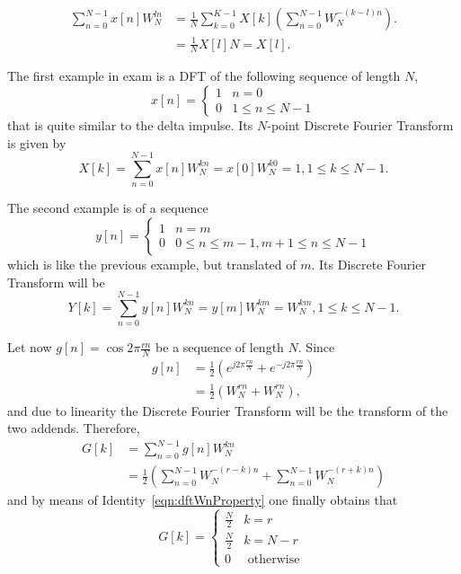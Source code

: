 \documentclass[\documentfontsize, twocolumn]{\classname}
\begin{document}
\begin{align*}
    \sum_{n=0}^{N-1} x[n] W_N^{ln}
    &= \frac 1 N \sum_{k=0}^{K-1} X[k] \left(\sum_{n=0}^{N-1}W_N^{-(k-l)n}\right).\\
    &= \frac 1 N X[l] N = X[l].
\end{align*}

The first example in exam is a DFT of the following sequence of length $N$,
\[
    x[n] = \left\{\begin{array}{ll} 
            1 & n=0\\
            0 & 1 \leq n \leq N-1
        \end{array}\right.
\]
that is quite similar to the delta impulse. Its $N$-point Discrete Fourier Transform is given by
\[
    X[k] = \sum_{n=0}^{N-1} x[n]W_N^{kn} = x[0]W_N^{k0} = 1, 1\leq k \leq N-1.
\]

The second example is of a sequence
\[
    y[n] = \left\{\begin{array}{ll} 
            1 & n=m\\
            0 & 0\leq n \leq m-1, m+1 \leq n \leq N-1
        \end{array}\right.
\]
which is like the previous example, but translated of $m$. Its Discrete Fourier Transform will be
\[
    Y[k] = \sum_{n=0}^{N-1} y[n]W_N^{kn} = y[m]W_N^{km} = W_N^{km}, 1\leq k \leq N-1.
\]

Let now $g[n] = \cos{2\pi \frac{rn}{N}}$ be a sequence of length $N$. Since
\begin{align*}
    g[n] &= \frac 1 2 \left(e^{j2\pi \frac{rn}{N}} + e^{-j2\pi \frac{rn}{N}}\right)\\
         &= \frac 1 2 \left(W_N^{rn} + W_N^{rn}\right),
\end{align*}
and due to linearity the Discrete Fourier Transform will be the transform of the two addends. Therefore,
\begin{align*}
    G[k] &= \sum_{n=0}^{N-1} g[n] W_N^{kn} \\
         &= \frac 1 2 \left(\sum_{n=0}^{N-1} W_N^{-(r-k)n} + \sum_{n=0}^{N-1} W_N^{-(r+k)n}\right)
\end{align*}
and by means of Identity~\ref{eqn:dftWnProperty} one finally obtains that
\[
    G[k] = \left\{\begin{array}{ll}
            \frac N 2 & k = r\\
            \frac N 2 & k = N - r\\
            0         & \mbox{ otherwise }
    \end{array}\right.
\]
\end{document}
